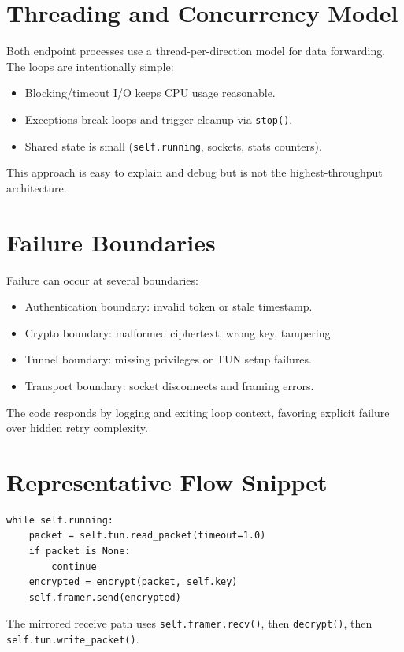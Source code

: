\section{Threading and Concurrency Model}
Both endpoint processes use a thread-per-direction model for data forwarding. The loops are intentionally simple:

\begin{itemize}[leftmargin=2em]
\item Blocking/timeout I/O keeps CPU usage reasonable.
\item Exceptions break loops and trigger cleanup via \texttt{stop()}.
\item Shared state is small (\texttt{self.running}, sockets, stats counters).
\end{itemize}

This approach is easy to explain and debug but is not the highest-throughput architecture.

\section{Failure Boundaries}
Failure can occur at several boundaries:
\begin{itemize}[leftmargin=2em]
\item Authentication boundary: invalid token or stale timestamp.
\item Crypto boundary: malformed ciphertext, wrong key, tampering.
\item Tunnel boundary: missing privileges or TUN setup failures.
\item Transport boundary: socket disconnects and framing errors.
\end{itemize}

The code responds by logging and exiting loop context, favoring explicit failure over hidden retry complexity.

\section{Representative Flow Snippet}
\begin{lstlisting}[style=vpnpython,caption={Client data-plane pattern (conceptualized from implementation)}]
while self.running:
    packet = self.tun.read_packet(timeout=1.0)
    if packet is None:
        continue
    encrypted = encrypt(packet, self.key)
    self.framer.send(encrypted)
\end{lstlisting}

The mirrored receive path uses \texttt{self.framer.recv()}, then \texttt{decrypt()}, then \texttt{self.tun.write\_packet()}.

